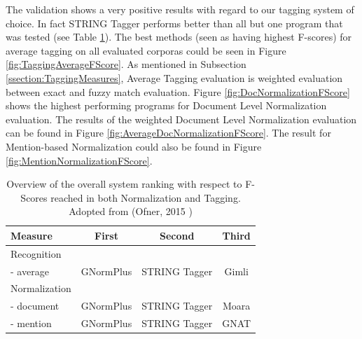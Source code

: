 The validation shows a very positive results with regard to our tagging system of choice. In fact STRING Tagger performs better than all but one program that was tested (see Table \ref{tab:NERRanking}). The best methods (seen as having highest F-scores) for average tagging on all evaluated corporas could be seen in Figure \ref{fig:TaggingAverageFScore}. As mentioned in Subsection \ref{ssection:TaggingMeasures}, Average Tagging evaluation is weighted evaluation between exact and fuzzy match evaluation. Figure \ref{fig:DocNormalizationFScore} shows the highest performing programs for Document Level Normalization evaluation. The results of the weighted Document Level Normalization evaluation can be found in Figure \ref{fig:AverageDocNormalizationFScore}. The result for Mention-based Normalization could also be found in Figure \ref{fig:MentionNormalizationFScore}.


\begin{table}[htbp]
\caption{Overview of the overall system ranking with respect to F-Scores reached in
both Normalization and Tagging. Adopted from (Ofner, 2015 \citep{ofner2015evaluation})}
\centering
\begin{tabular}{ l c c c }
  \hline
  Measure & First & Second & Third \\
  \hline
  \hline
  Recognition &  &  &  \\
  - average &  GNormPlus & STRING Tagger & Gimli \\
  \hline
  Normalization&  &  &  \\
  - document & GNormPlus & STRING Tagger & Moara \\
  - mention & GNormPlus & STRING Tagger & GNAT \\
  \hline
\end{tabular}
  \label{tab:NERRanking}
\end{table}

